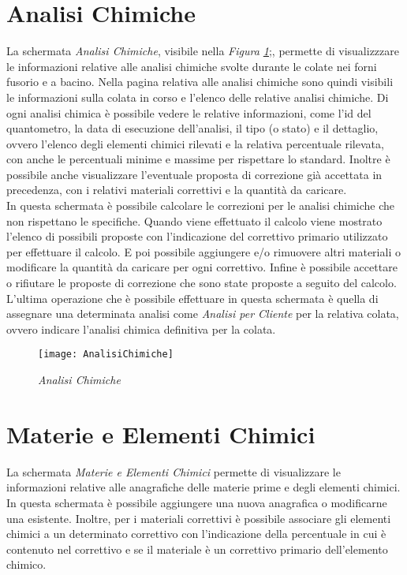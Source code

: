   \section{Analisi Chimiche}
  La schermata \textit{Analisi Chimiche}, visibile nella \textit{Figura \ref{fig:AnalisiChimiche}};,
  permette di visualizzzare le informazioni relative alle
  analisi chimiche svolte durante le colate nei forni fusorio e a bacino. Nella pagina relativa alle analisi chimiche sono
  quindi visibili le informazioni sulla colata in corso e l'elenco delle relative analisi chimiche. Di ogni analisi chimica
  è possibile vedere le relative informazioni, come l'id del quantometro, la data di esecuzione dell'analisi, il tipo (o stato) e
  il dettaglio, ovvero l'elenco degli elementi chimici rilevati e la relativa percentuale rilevata, con anche le percentuali
  minime e massime per rispettare lo standard. Inoltre è possibile anche visualizzare l'eventuale proposta di correzione già
  accettata in precedenza, con i relativi materiali correttivi e la quantità da caricare.\\
  In questa schermata è possibile calcolare le correzioni per le analisi chimiche che non rispettano le specifiche. Quando
  viene effettuato il calcolo viene mostrato l'elenco di possibili proposte con l'indicazione del correttivo primario utilizzato
  per effettuare il calcolo. E poi possibile aggiungere e/o rimuovere altri materiali o modificare la quantità da caricare
  per ogni correttivo. Infine è possibile accettare o rifiutare le proposte di correzione che sono state proposte a seguito del
  calcolo.\\
  L'ultima operazione che è possibile effettuare in questa schermata è quella di assegnare una determinata analisi come
  \textit{Analisi per Cliente} per la relativa colata, ovvero indicare l'analisi chimica definitiva per la colata.

  \begin{figure}[H]
    \texttt{[image: AnalisiChimiche]}
    \centering
    \caption{\textit{Analisi Chimiche}} 
    \label{fig:AnalisiChimiche}
  \end{figure}

  \section{Materie e Elementi Chimici}
  La schermata \textit{Materie e Elementi Chimici} permette di visualizzare le informazioni
  relative alle anagrafiche delle materie prime e degli elementi chimici. In questa schermata è possibile aggiungere una nuova
  anagrafica o modificarne una esistente. Inoltre, per i materiali correttivi è possibile associare gli elementi chimici
  a un determinato correttivo con l'indicazione della percentuale in cui è contenuto nel correttivo e se il materiale è un
  correttivo primario dell'elemento chimico. 


